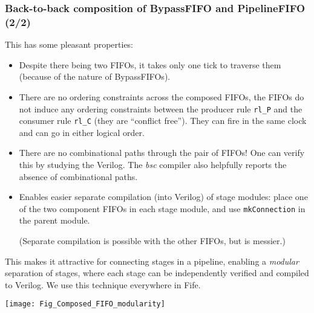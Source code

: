 \begin{frame}[fragile]
\frametitle{Back-to-back composition of BypassFIFO and PipelineFIFO (2/2)}

\label{Slide_FIFO_Composition}

\footnotesize

This has some pleasant properties:

\vspace{1ex}

\begin{itemize}

 \item Despite there being two FIFOs, it takes only one tick to
        traverse them (because of the nature of BypassFIFOs).

 \PAUSE{\vx}

 \item There are no ordering constraints across the composed FIFOs,
       {\ie} the FIFOs do not induce any ordering constraints between
       the producer rule \verb|rl_P| and the consumer rule \verb|rl_C|
       (they are ``conflict free'').  They can fire in the same clock
       and can go in either logical order.

 \PAUSE{\vx}

 \item There are no combinational paths through the pair of FIFOs!
       One can verify this by studying the Verilog.  The \emph{bsc}
       compiler also helpfully reports the absence of combinational
       paths.

 \PAUSE{\vx}

 \item Enables easier separate compilation (into Verilog) of stage
       modules: place one of the two component FIFOs in each stage
       module, and use {\tt mkConnection} in the parent module.

       \vx

       (Separate compilation is possible with the other FIFOs, but is messier.)

\end{itemize}

\PAUSE{\vxxxx}

\begin{minipage}{0.37\textwidth}
This makes it attractive for connecting stages in a pipeline, enabling
a \emph{modular} separation of stages, where each stage can be
independently verified and compiled to Verilog. We use this technique
everywhere in Fife.
\end{minipage}
\hfill
\begin{minipage}{0.6\textwidth}
  \texttt{[image: Fig\_Composed\_FIFO\_modularity]}
\end{minipage}

\end{frame}


